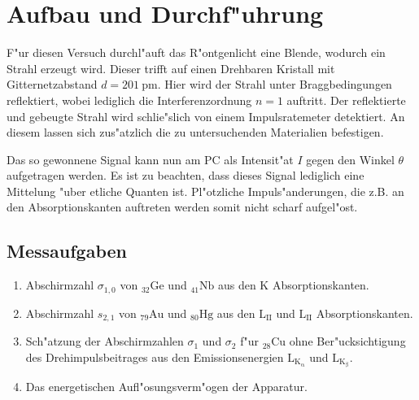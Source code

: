 \section{Aufbau und Durchf"uhrung}
	\label{sec:durchfuehrung}
	F"ur diesen Versuch durchl"auft das R"ontgenlicht eine Blende, wodurch ein Strahl erzeugt wird.
	Dieser trifft auf einen Drehbaren Kristall mit Gitternetzabstand $d = \SI{201}{\pico \meter}$.
	Hier wird der Strahl unter Braggbedingungen reflektiert, wobei lediglich die In\-ter\-fe\-renz\-ord\-nung $n = 1$ auftritt.
	Der reflektierte und gebeugte Strahl wird schlie"slich von einem Im\-puls\-ra\-te\-me\-ter detektiert.
	An diesem lassen sich zus"atzlich die zu untersuchenden Materialien befestigen.

	Das so gewonnene Signal kann nun am PC als Intensit"at $I$ gegen den Winkel $\theta$ aufgetragen werden.
	Es ist zu beachten, dass dieses Signal lediglich eine Mittelung "uber etliche Quanten ist.
	Pl"otzliche Impuls"anderungen, die z.B. an den Absorptionskanten auftreten werden somit nicht scharf aufgel"ost.

	\subsection{Messaufgaben}
		\begin{enumerate}
			\item{Abschirmzahl $\sigma_{1,0}$ von ${}_{32} \mathrm{Ge}$ und ${}_{41} \mathrm{Nb}$ aus den K Absorptionskanten.}
			\item{Abschirmzahl $s_{2,1}$ von ${}_{79} \mathrm{Au}$ und ${}_{80} \mathrm{Hg}$ aus den $\mathrm{L}_\mathrm{II}$ und $\mathrm{L}_\mathrm{II}$ Absorptionskanten.}
			\item{Sch"atzung der Abschirmzahlen $\sigma_{1}$ und $\sigma_{2}$ f"ur ${}_{28} \mathrm{Cu}$ ohne Ber"ucksichtigung des Drehimpulsbeitrages aus den Emissionsenergien $\mathrm{L}_\mathrm{K_\mathrm{\alpha}}$ und $\mathrm{L}_\mathrm{K_\mathrm{\beta}}$.}
			\item{Das energetischen Aufl"osungsverm"ogen der Apparatur.}
		\end{enumerate}